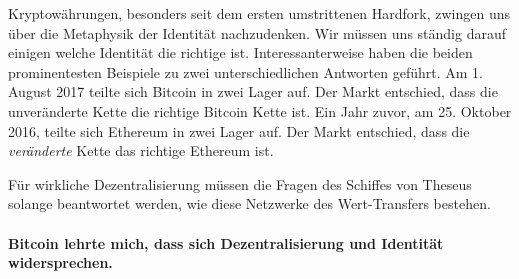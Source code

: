 Kryptowährungen, besonders seit dem ersten umstrittenen Hardfork, zwingen uns
über die Metaphysik der Identität nachzudenken. Wir müssen uns ständig darauf
einigen welche Identität die richtige ist. Interessanterweise haben die beiden
prominentesten Beispiele zu zwei  unterschiedlichen Antworten geführt. Am 1.
August 2017 teilte sich Bitcoin in zwei Lager auf. Der Markt entschied, dass die
unveränderte Kette die richtige Bitcoin Kette ist. Ein Jahr zuvor, am 25. Oktober
2016, teilte sich Ethereum in zwei Lager auf. Der Markt entschied, dass die
\textit{veränderte} Kette das richtige Ethereum ist.

Für wirkliche Dezentralisierung müssen die Fragen des Schiffes von Theseus
solange beantwortet werden, wie diese Netzwerke des Wert-Transfers bestehen.

\paragraph{Bitcoin lehrte mich, dass sich Dezentralisierung und Identität widersprechen.}

%
%
%
%
